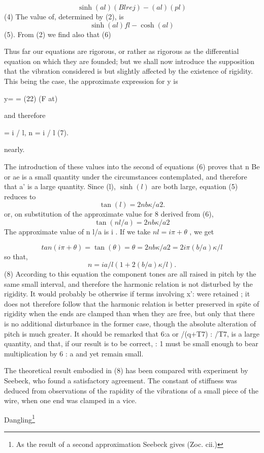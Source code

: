 \[ \sinh(al) (Bl re j) - (al) (pl)\]
(4) The value of,
determined by (2), is
\[ \sinh(al) fl  - \cosh(al) \]
(5).  From (2) we find also that (6)

Thus far our equations are rigorous, or rather as rigorous as the
differential equation on which they are founded; but we shall now
introduce the supposition that the vibration considered is but slightly
affected by the existence of rigidity. This being the case, the
approximate expression for y is

y= = (22) (F at)

and therefore

= i / l, n = i / l (7).

nearly.

The introduction of these values into the second of equations (6) proves
that n Be or ae is a small quantity under the circumstances
contemplated, and therefore that a' is a large quantity. Since (l),
\( \sinh(l) \)
are both large, equation (5) reduces to
\[ \tan(l) = 2 n b \kappa /a2.  \]
or, on substitution of the approximate value for 8 derived from (6),
\[ \tan( n l/ a) = 2 n b \kappa/ a2 \]
The approximate value of n l/a is i . If we take
\(n l = i \pi  + \theta\) , we get

\[tan (i \pi + \theta ) = \tan(\theta ) = \theta =
 2 n b \kappa/ a2 = 2 i \pi (b/a) \kappa / l\]
so that,
\[ n = i a/l (1 + 2 (b/a) \kappa/l).  \]
(8) According to this equation the component tones are all raised in pitch
by the same small interval, and therefore the harmonic relation is not
disturbed by the rigidity. It would probably be otherwise if terms
involving x': were retained ; it does not therefore follow that the
harmonic relation is better preserved in spite of rigidity when the ends
are clamped than when they are free, but only that there is no
additional disturbance in the former case, though the absolute
alteration of pitch is much greater. It should be remarked that 6:a or
/(q+T7) : /T7, is a large quantity, and that, if our result is to be
correct, : 1 must be small enough to bear multiplication by 6 : a and
yet remain small.

The theoretical result embodied in (8) has been compared with experiment
by Seebeck, who found a satisfactory agreement. The constant of
stiffness was deduced from observations of the rapidity of the
vibrations of a small piece of the wire, when one end was clamped in a vice.



Dangling\footnote{As the result of a second approximation Seebeck gives (Zoc. cii.)}

